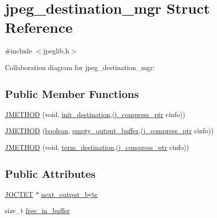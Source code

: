 \hypertarget{structjpeg__destination__mgr}{}\section{jpeg\+\_\+destination\+\_\+mgr Struct Reference}
\label{structjpeg__destination__mgr}


{\ttfamily \#include $<$jpeglib.\+h$>$}



Collaboration diagram for jpeg\+\_\+destination\+\_\+mgr\+:
\subsection*{Public Member Functions}
\begin{DoxyCompactItemize}
\item 
\mbox{\hyperlink{structjpeg__destination__mgr_ae29d14eb632140c7c67eda8c5824383c}{J\+M\+E\+T\+H\+OD}} (void, \mbox{\hyperlink{jdatadst_8c_abc7ed5278b728c7fd1cb2b00d5297c75}{init\+\_\+destination}},(\mbox{\hyperlink{jpeglib_8h_add2a072c54e3a51550f4975f7ddb91e7}{j\+\_\+compress\+\_\+ptr}} cinfo))
\item 
\mbox{\hyperlink{structjpeg__destination__mgr_a7357b5d5cab543cfa243dd59f101b8f2}{J\+M\+E\+T\+H\+OD}} (\mbox{\hyperlink{jmorecfg_8h_a7c6368b321bd9acd0149b030bb8275ed}{boolean}}, \mbox{\hyperlink{jdatadst_8c_ad29423c77a4142a1ec1771aa4a419a09}{empty\+\_\+output\+\_\+buffer}},(\mbox{\hyperlink{jpeglib_8h_add2a072c54e3a51550f4975f7ddb91e7}{j\+\_\+compress\+\_\+ptr}} cinfo))
\item 
\mbox{\hyperlink{structjpeg__destination__mgr_a1158df5e49ecfa2a7d0905eef216afbf}{J\+M\+E\+T\+H\+OD}} (void, \mbox{\hyperlink{jdatadst_8c_a6501130b84bb53734f08418196d00dc4}{term\+\_\+destination}},(\mbox{\hyperlink{jpeglib_8h_add2a072c54e3a51550f4975f7ddb91e7}{j\+\_\+compress\+\_\+ptr}} cinfo))
\end{DoxyCompactItemize}
\subsection*{Public Attributes}
\begin{DoxyCompactItemize}
\item 
\mbox{\hyperlink{jmorecfg_8h_a356ad249f20e691b520da439f92cccbc}{J\+O\+C\+T\+ET}} $\ast$ \mbox{\hyperlink{structjpeg__destination__mgr_a3dac0ab8cc4daeb1efb9fea2e07449c0}{next\+\_\+output\+\_\+byte}}
\item 
size\+\_\+t \mbox{\hyperlink{structjpeg__destination__mgr_a397cc63a089447fe96e35062c4979906}{free\+\_\+in\+\_\+buffer}}
\end{DoxyCompactItemize}


